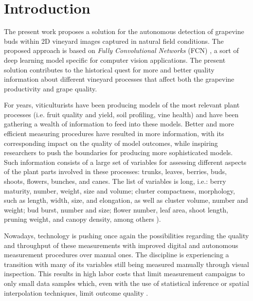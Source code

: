 \documentclass[a4paper,authoryear,review]{elsarticle}
\begin{document}
	\linenumbers
	
	
	
	\section{Introduction}
	
	The present work proposes a solution for the autonomous detection of grapevine buds within 2D vineyard images captured in natural field conditions. The proposed approach is based on \emph{Fully Convolutional Networks} (FCN) \citep{long2015fully, shelhamer2017fully}, a sort of deep learning model specific for computer vision applications. The present solution contributes to the historical quest for more and better quality information about different vineyard processes that affect both the grapevine productivity and grape quality. 
	
	For years, viticulturists have been producing models of the most relevant plant processes (i.e. fruit quality and yield, soil profiling, vine health) and have been gathering a wealth of information to feed into these models. Better and more efficient measuring procedures have resulted in more information, with its corresponding impact on the quality of model outcomes, while inspiring researchers to push the boundaries for producing more sophisticated models. Such information consists of a large set of variables for assessing different aspects of the plant parts involved in these processes: trunks, leaves, berries, buds, shoots, flowers, bunches, and canes. The list of variables is long, i.e.: berry maturity, number, weight, size and volume; cluster compactness, morphology, such as length, width, size, and elongation, as well as cluster volume, number and weight; bud burst, number and size; flower number, leaf area, shoot length, pruning weight, and canopy density, among others \citep{awriNDmanual1, awriNDmanual3}).
	
	Nowadays, technology is pushing once again the possibilities regarding the quality and throughput of these measurements with improved digital and autonomous measurement procedures over manual ones. The discipline is experiencing a transition with many of its variables still being measured manually through visual inspection. This results in high labor costs that limit measurement campaigns to only small data samples which, even with the use of statistical inference or spatial interpolation techniques, limit outcome quality \citep{whelan1996spatial}. 
	
\end{document}
